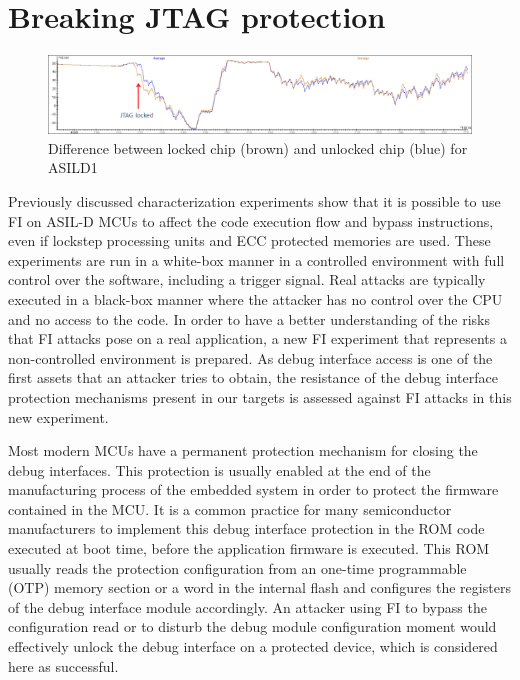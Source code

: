 \documentclass[a4paper, 10pt]{IEEEtran}
\newcommand{\TI}{ASILD1\xspace}
\begin{document}
\section{Breaking JTAG protection}
\label{sec:jtag}
\begin{figure}[ht]
  \centering
  \includegraphics[width=\textwidth]{tms570-DPA-jtag}
  \caption{Difference between locked chip (brown) and unlocked chip (blue) for \TI}
  \label{fig:jtag-ti}
\end{figure}
Previously discussed characterization experiments show that it is possible to use FI on ASIL-D MCUs to affect the code execution flow and bypass instructions, even if lockstep processing units and ECC protected memories are used. These experiments are run in a white-box manner in a controlled environment with full control over the software, including a trigger signal. Real attacks are typically executed in a black-box manner where the attacker has no control over the CPU and no access to the code.  In order to have a better understanding of the risks that FI attacks pose on a real application, a new FI experiment that represents a non-controlled environment is prepared. As debug interface access is one of the first assets that an attacker tries to obtain, the resistance of the debug interface protection mechanisms present in our targets is assessed against FI attacks in this new experiment.

Most modern MCUs have a permanent protection mechanism for closing the debug interfaces. This protection is usually enabled at the end of the manufacturing process of the embedded system in order to protect the firmware contained in the MCU. It is a common practice for many semiconductor manufacturers to implement this debug interface protection in the ROM code executed at boot time, before the application firmware is executed. This ROM usually reads the protection configuration from an one-time programmable (OTP) memory section or a word in the internal flash and configures the registers of the debug interface module accordingly. An attacker using FI to bypass the configuration read or to disturb the debug module configuration moment would effectively unlock the debug interface on a protected device, which is considered here as successful. 
\end{document}
